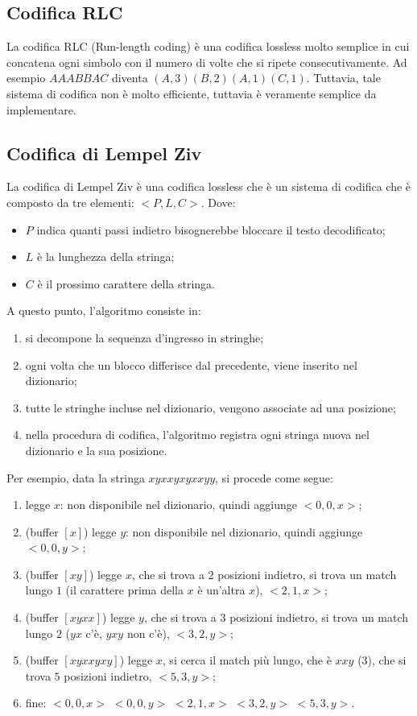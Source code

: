 \subsection{Codifica RLC}
La codifica RLC (Run-length coding) è una codifica lossless molto semplice in cui concatena ogni simbolo con il numero di volte che si ripete
consecutivamente. Ad esempio $AAABBAC$ diventa $(A, 3)(B, 2)(A, 1)(C, 1)$. Tuttavia, tale sistema di codifica non è molto efficiente, tuttavia è
veramente semplice da implementare.
\subsection{Codifica di Lempel Ziv}
La codifica di Lempel Ziv è una codifica lossless che è un sistema di codifica che è composto da tre elementi: $<P,L,C>$. Dove:
\begin{itemize}
    \item $P$ indica quanti passi indietro bisognerebbe bloccare il testo decodificato;
    \item $L$ è la lunghezza della stringa;
    \item $C$ è il prossimo carattere della stringa.
\end{itemize}
A questo punto, l'algoritmo consiste in:
\begin{enumerate}
    \item si decompone la sequenza d'ingresso in stringhe;
    \item ogni volta che un blocco differisce dal precedente, viene inserito nel dizionario;
    \item tutte le stringhe incluse nel dizionario, vengono associate ad una posizione;
    \item nella procedura di codifica, l'algoritmo registra ogni stringa nuova nel dizionario e la sua posizione.
\end{enumerate}
Per esempio, data la stringa $xyxxyxyxxyy$, si procede come segue:
\begin{enumerate}
    \item legge $x$: non disponibile nel dizionario, quindi aggiunge $<0, 0, x>$;
    \item (buffer $[x]$) legge $y$: non disponibile nel dizionario, quindi aggiunge $<0, 0, y>$;
    \item (buffer $[xy]$) legge $x$, che si trova a $2$ posizioni indietro, si trova un match lungo $1$ (il carattere prima della $x$ è un'altra $x$), $<2, 1, x>$;
    \item (buffer $[xyxx]$) legge $y$, che si trova a $3$ posizioni indietro, si trova un match lungo $2$ ($yx$ c'è, $yxy$ non c'è), $<3, 2, y>$;
    \item (buffer $[xyxxyxy]$) legge $x$, si cerca il match più lungo, che è $xxy$ ($3$), che si trova $5$ posizioni indietro, $<5, 3, y>$;
    \item fine: $<0, 0, x>$ $<0, 0, y>$ $<2, 1, x>$ $<3, 2, y>$ $<5, 3, y>$.
\end{enumerate}
